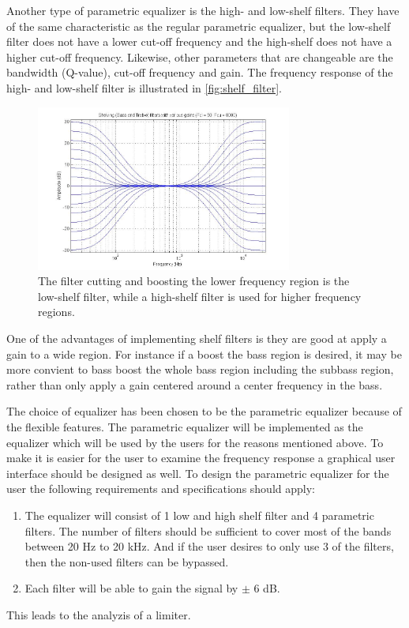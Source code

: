 Another type of parametric equalizer is the high- and low-shelf filters. They have of the same characteristic as the regular parametric equalizer, but the low-shelf filter does not have a lower cut-off frequency and the high-shelf does not have a higher cut-off frequency. Likewise, other parameters that are changeable are the bandwidth (Q-value), cut-off frequency and gain. The frequency response of the high- and low-shelf filter is illustrated in \autoref{fig:shelf_filter}.

\begin{figure}[H]
\centering
\includegraphics[width=0.75\textwidth]{figures/shelf_filter.jpg}
\caption{The filter cutting and boosting the lower frequency region is the low-shelf filter, while a high-shelf filter is used for higher frequency regions.}
\label{fig:shelf_filter}
\end{figure}

One of the advantages of implementing shelf filters is they are good at apply a gain to a wide region. For instance if a boost the bass region is desired, it may be more convient to bass boost the whole bass region including the subbass region, rather than only apply a gain centered around a center frequency in the bass.

The choice of equalizer has been chosen to be the parametric equalizer because of the flexible features. The parametric equalizer will be implemented as the equalizer which will be used by the users for the reasons mentioned above. To make it is easier for the user to examine the frequency response a graphical user interface should be designed as well. To design the parametric equalizer for the user the following requirements and specifications should apply:
\begin{enumerate}
\item The equalizer will consist of 1 low and high shelf filter and 4 parametric filters. The number of filters should be sufficient to cover most of the bands between 20 Hz to 20 kHz. And if the user desires to only use 3 of the filters, then the non-used filters can be bypassed.
\item Each filter will be able to gain the signal by $\pm$ 6 dB.
\end{enumerate}
This leads to the analyzis of a limiter.

